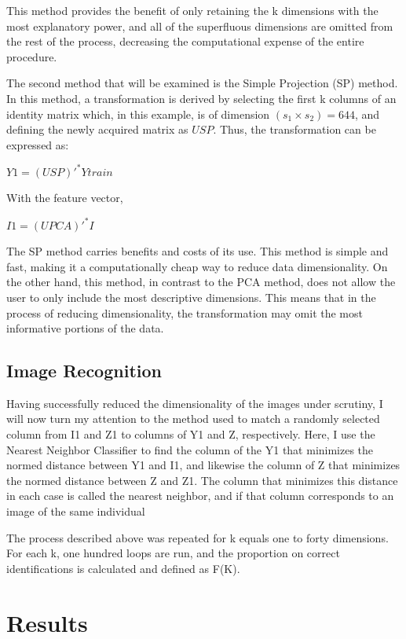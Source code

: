 \documentclass[11pt]{article} %
\begin{document}
This method provides the benefit of only retaining the k dimensions with the most explanatory power, and all of the superfluous dimensions are omitted from the rest of the process, decreasing the computational expense of the entire procedure.

The second method that will be examined is the Simple Projection (SP) method. In this method, a transformation is derived by selecting the first k columns of an identity matrix which, in this example, is of dimension $(s_{1} \times s_{2})=644$, and defining the newly acquired matrix as $USP$. Thus, the transformation can be expressed as:
\begin{center}
$Y1=(USP)'^{*}Ytrain$
\end{center}

With the feature vector,
\begin{center}
$I1=(UPCA)'^{*}I$
\end{center}

The SP method carries benefits and costs of its use. This method is simple and fast, making it a computationally cheap way to reduce data dimensionality. On the other hand, this method, in contrast to the PCA method, does not allow the user to only include the most descriptive dimensions. This means that in the process of reducing dimensionality, the transformation may omit the most informative portions of the data.
\subsection{Image Recognition}
Having successfully reduced the dimensionality of the images under scrutiny, I will now turn my attention to the method used to match a randomly selected column from I1 and Z1 to columns of Y1 and  Z, respectively. Here, I use the Nearest Neighbor Classifier to find the column of the Y1 that minimizes the normed distance between Y1 and I1, and likewise the column of Z that minimizes the normed distance between Z and Z1. The column that minimizes this distance in each case is called the nearest neighbor, and if that column corresponds to an image of the same individual 

The process described above was repeated for k equals one to forty dimensions. For each k, one hundred loops are run, and the proportion on correct identifications is calculated and defined as F(K).  

\section{Results}
\end{document}
